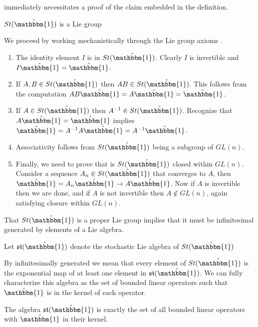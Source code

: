 immediately necessitates a proof of the claim embedded in the definition.
\begin{lemma}
	$St(\hat{\mathbbm{1}})$ is a Lie group
\end{lemma}
\begin{IEEEproof}
	We proceed by working mechanistically through the Lie group axioms \cite{hall_lie_2004}.
	\begin{enumerate}
		\item The identity element $I$ is in $St(\hat{\mathbbm{1}})$. Clearly $I$ is invertible
		and $I \hat{\mathbbm{1}} = \hat{\mathbbm{1}}$.
		\item If $A,B \in St(\hat{\mathbbm{1}})$ then $AB \in St(\hat{\mathbbm{1}})$. This
		follows from the computation $AB \hat{\mathbbm{1}} = A \hat{\mathbbm{1}} = \hat{\mathbbm{1}}$.
		\item If $A \in St(\hat{\mathbbm{1}})$ then $A^{-1} \in St(\hat{\mathbbm{1}})$.
		Recognize that $A \hat{\mathbbm{1}} = \hat{\mathbbm{1}}$ implies $\hat{\mathbbm{1}} = A^{-1} A \hat{\mathbbm{1}} = A^{-1} \hat{\mathbbm{1}}$.
		\item Associativity follows from $St(\hat{\mathbbm{1}})$ being a subgroup of $GL\left(n\right)$.
		\item Finally, we need to prove that is $St(\hat{\mathbbm{1}})$ closed within $GL\left(n\right)$.
		Consider a sequence $A_n \in St(\hat{\mathbbm{1}})$ that converges to $A$, then $\hat{\mathbbm{1}} = A_n \hat{\mathbbm{1}} \rightarrow A \hat{\mathbbm{1}}$. 
		Now if $A$ is invertible then we are done, and if $A$ is not invertible then $A \notin GL\left(n\right)$,
		again satisfying closure within $GL\left(n\right)$.\hfill\IEEEQEDhere
	\end{enumerate}
\end{IEEEproof}
That $St(\hat{\mathbbm{1}})$ is a proper Lie group implies that it must be infinitesimal
generated by elements of a Lie algebra.
\begin{definition}
	Let $\mathfrak{st}(\hat{\mathbbm{1}})$ denote the stochastic Lie algebra of $St(\hat{\mathbbm{1}})$
\end{definition}
By infinitesimally generated we mean that every element of $St(\hat{\mathbbm{1}})$ is the
exponential map of at least one element in $\mathfrak{st}(\hat{\mathbbm{1}})$. We can fully
characterize this algebra as the set of bounded linear operators such that $\hat{\mathbbm{1}}$
is in the kernel of each operator.
\begin{lemma}
	The algebra $\mathfrak{st}(\hat{\mathbbm{1}})$ is exactly the set of all bounded linear
	operators with $\hat{\mathbbm{1}}$ in their kernel.
\end{lemma}
